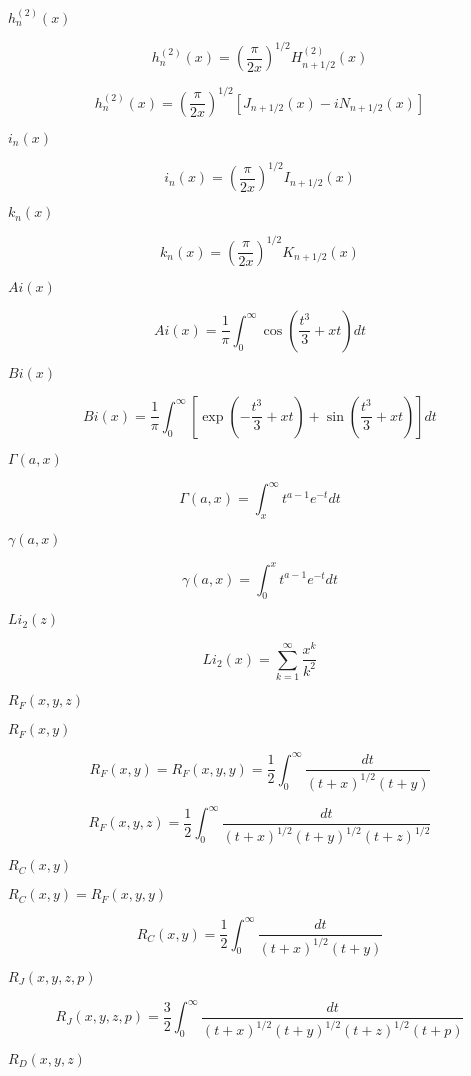 \documentclass{article}
\begin{document}
$ h^{(2)}_n(x)$
\pagebreak

\[ h^{(2)}_n(x) = \left(\frac{\pi}{2x} \right) ^{1/2} H^{(2)}_{n+1/2}(x) \]
\pagebreak

\[ h^{(2)}_n(x) = \left(\frac{\pi}{2x} \right) ^{1/2} \left[ J_{n+1/2}(x) - iN_{n+1/2}(x) \right] \]
\pagebreak

$ i_n(x) $
\pagebreak

\[ i_n(x) = \left(\frac{\pi}{2x} \right) ^{1/2} I_{n+1/2}(x) \]
\pagebreak

$ k_n(x) $
\pagebreak

\[ k_n(x) = \left(\frac{\pi}{2x} \right) ^{1/2} K_{n+1/2}(x) \]
\pagebreak

$ Ai(x) $
\pagebreak

\[ Ai(x) = \frac{1}{\pi}\int_0^\infty \cos \left(\frac{t^3}{3} + xt \right)dt \]
\pagebreak

$ Bi(x) $
\pagebreak

\[ Bi(x) = \frac{1}{\pi}\int_0^\infty \left[ \exp \left(-\frac{t^3}{3} + xt \right) + \sin \left(\frac{t^3}{3} + xt \right) \right] dt \]
\pagebreak

$ \Gamma(a,x) $
\pagebreak

\[ \Gamma(a,x) = \int_x^\infty t^{a-1}e^{-t}dt \]
\pagebreak

$ \gamma(a,x) $
\pagebreak

\[ \gamma(a,x) = \int_0^x t^{a-1}e^{-t}dt \]
\pagebreak

$ Li_2(z) $
\pagebreak

\[ Li_2(x) = \sum_{k=1}^{\infty}\frac{x^k}{k^2} \]
\pagebreak

$ R_F(x,y,z) $
\pagebreak

$ R_F(x,y) $
\pagebreak

\[ R_F(x,y) = R_F(x,y,y) = \frac{1}{2} \int_0^\infty \frac{dt}{(t + x)^{1/2}(t + y)} \]
\pagebreak

\[ R_F(x,y,z) = \frac{1}{2} \int_0^\infty \frac{dt}{(t + x)^{1/2}(t + y)^{1/2}(t + z)^{1/2}} \]
\pagebreak

$ R_C(x,y) $
\pagebreak

$ R_C(x,y) = R_F(x,y,y) $
\pagebreak

\[ R_C(x,y) = \frac{1}{2} \int_0^\infty \frac{dt}{(t + x)^{1/2}(t + y)} \]
\pagebreak

$ R_J(x,y,z,p) $
\pagebreak

\[ R_J(x,y,z,p) = \frac{3}{2} \int_0^\infty \frac{dt}{(t + x)^{1/2}(t + y)^{1/2}(t + z)^{1/2}(t + p)} \]
\pagebreak

$ R_D(x,y,z) $
\pagebreak
\end{document}
